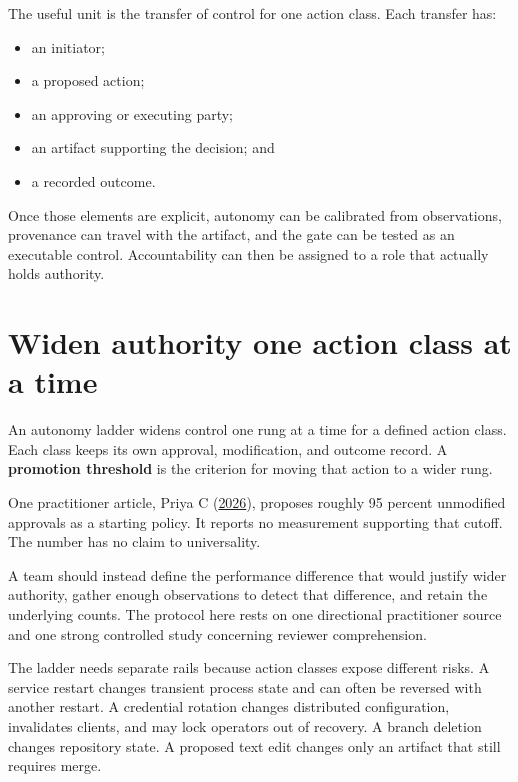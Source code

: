 
The useful unit is the transfer of control for one action class. Each transfer has:

\begin{itemize}
\tightlist
\item
  an initiator;
\item
  a proposed action;
\item
  an approving or executing party;
\item
  an artifact supporting the decision; and
\item
  a recorded outcome.
\end{itemize}

Once those elements are explicit, autonomy can be calibrated from observations, provenance can travel with the artifact, and the gate can be tested as an executable control. Accountability can then be assigned to a role that actually holds authority.

\hypertarget{widen-authority-one-action-class-at-a-time}{%
\section{Widen authority one action class at a time}\label{widen-authority-one-action-class-at-a-time}}

An autonomy ladder widens control one rung at a time for a defined action class. Each class keeps its own approval, modification, and outcome record. A \textbf{promotion threshold} is the criterion for moving that action to a wider rung.

One practitioner article, Priya C (\href{https://devops.com/when-should-a-devops-agent-act-without-human-approval/}{2026}), proposes roughly 95 percent unmodified approvals as a starting policy. It reports no measurement supporting that cutoff. The number has no claim to universality.

A team should instead define the performance difference that would justify wider authority, gather enough observations to detect that difference, and retain the underlying counts. The protocol here rests on one directional practitioner source and one strong controlled study concerning reviewer comprehension.

The ladder needs separate rails because action classes expose different risks. A service restart changes transient process state and can often be reversed with another restart. A credential rotation changes distributed configuration, invalidates clients, and may lock operators out of recovery. A branch deletion changes repository state. A proposed text edit changes only an artifact that still requires merge.

